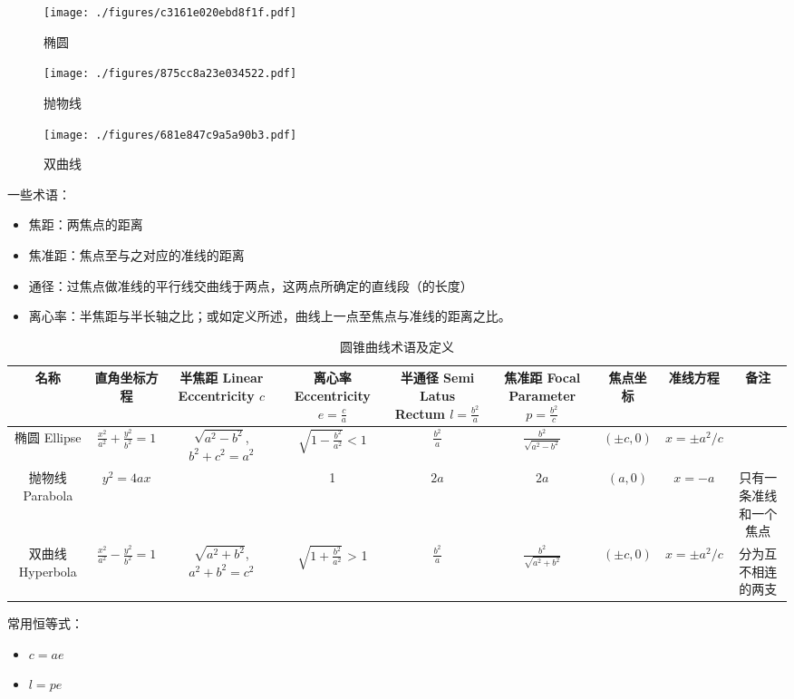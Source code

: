 \begin{figure}[ht]
\centering
\texttt{[image: ./figures/c3161e020ebd8f1f.pdf]}
\caption{椭圆} \label{fig_conic_2}
\end{figure}

\begin{figure}[ht]
\centering
\texttt{[image: ./figures/875cc8a23e034522.pdf]}
\caption{抛物线} \label{fig_conic_3}
\end{figure}

\begin{figure}[ht]
\centering
\texttt{[image: ./figures/681e847c9a5a90b3.pdf]}
\caption{双曲线} \label{fig_conic_4}
\end{figure}

一些术语：
\begin{itemize}
\item 焦距：两焦点的距离
\item 焦准距：焦点至与之对应的准线的距离
\item 通径：过焦点做准线的平行线交曲线于两点，这两点所确定的直线段（的长度）
\item 离心率：半焦距与半长轴之比；或如定义所述，曲线上一点至焦点与准线的距离之比。
\end{itemize}

\begin{table}[ht]
\centering
\caption{圆锥曲线术语及定义}\label{tab_conic_1}
\begin{tabular}{|c|c|c|c|c|c|c|c|c|}
\hline
名称 & 直角坐标方程 & 半焦距 Linear Eccentricity $c$ & 离心率 Eccentricity $e = \frac{c}{a}$ & 半通径 Semi Latus Rectum $l=\frac{b^2}{a}$ & 焦准距 Focal Parameter$p=\frac{b^2}{c}$ & 焦点坐标&准线方程 &备注\\
\hline
椭圆 Ellipse & $\frac{x^2}{a^2} + \frac{y^2}{b^2} = 1$ & $\sqrt{a^2-b^2}$, $b^2+c^2=a^2$ & $\sqrt{1-\frac{b^2}{a^2}} < 1$ & $\frac{b^2}{a}$ & $\frac{b^2}{\sqrt{a^2-b^2}}$ & $(\pm c,0)$ & $x=\pm a^2/c$& \\
\hline
抛物线 Parabola & $y^2=4ax$ & \ & 1 & $2a$ & $2a$ & $(a,0)$ & $x=-a$ & 只有一条准线和一个焦点\\
\hline
双曲线 Hyperbola & $\frac{x^2}{a^2} - \frac{y^2}{b^2} = 1$ & $\sqrt{a^2+b^2}$,$a^2+b^2=c^2$ & $\sqrt{1+\frac{b^2}{a^2}}$ > 1 & $\frac{b^2}{a}$ & $\frac{b^2}{\sqrt{a^2+b^2}}$ & $(\pm c,0)$ & $x=\pm a^2/c$ & 分为互不相连的两支 \\
\hline
\end{tabular}
\end{table}

常用恒等式：
\begin{itemize}
\item $c=ae$
\item $l=pe$
\end{itemize}

